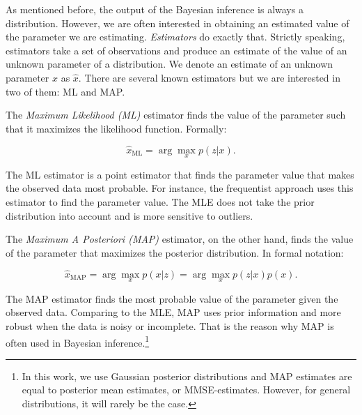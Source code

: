 As mentioned before, the output of the Bayesian inference is always a
distribution. However, we are often interested in obtaining an estimated value
of the parameter we are estimating. \textit{Estimators} do exactly that.
Strictly speaking, estimators take a set of observations and produce an 
estimate of the value of an unknown parameter of a distribution. We denote an
estimate of an unknown parameter $x$ as $\hat{x}$. There are several known 
estimators but we are interested in two of them: ML and MAP.

The \textit{Maximum Likelihood (ML)} estimator finds the value of the parameter 
such that it maximizes the likelihood function. Formally:

$$
\hat{x}_{\mathrm{ML}} = \arg \max_x p(z|x).
$$

The ML estimator is a point estimator that finds the parameter value that 
makes the observed data most probable. For instance, the frequentist approach
uses this estimator to find the parameter value. The MLE does not take the 
prior distribution into account and is more sensitive to outliers. 

The \textit{Maximum A Posteriori (MAP)} estimator, on the other hand, finds the 
value of the parameter that maximizes the posterior distribution. In formal 
notation:

$$
\hat{x}_{\mathrm{MAP}} = \arg \max_x p(x|z) = \arg \max_x p(z|x)p(x).
$$

The MAP estimator finds the most probable value of the parameter given the 
observed data. Comparing to the MLE, MAP uses prior information and more robust
when the data is noisy or incomplete. That is the reason why MAP is often used
in Bayesian inference.\footnote{
    In this work, we use Gaussian posterior distributions and MAP estimates are 
    equal to posterior mean estimates, or MMSE-estimates. However, for general 
    distributions, it will rarely be the case.
}
